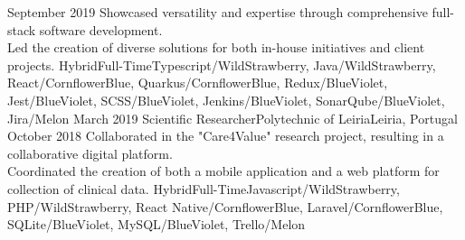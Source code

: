 \begin{experiences}
  {September 2019}    {Showcased versatility and expertise through comprehensive full-stack software development.\\
  Led the creation of diverse solutions for both in-house initiatives and client projects.}
  {Hybrid}{Full-Time}{Typescript/WildStrawberry, Java/WildStrawberry, React/CornflowerBlue, Quarkus/CornflowerBlue, Redux/BlueViolet, Jest/BlueViolet, SCSS/BlueViolet, Jenkins/BlueViolet, SonarQube/BlueViolet, Jira/Melon}
  \emptySeparator
  \experience
  {March 2019}     {Scientific Researcher}{Polytechnic of Leiria}{Leiria, Portugal}
  {October 2018}    {Collaborated in the "Care4Value" research project, resulting in a collaborative digital platform.\\
  Coordinated the creation of both a mobile application and a web platform for collection of clinical data.}
  {Hybrid}{Full-Time}{Javascript/WildStrawberry, PHP/WildStrawberry, React Native/CornflowerBlue, Laravel/CornflowerBlue, SQLite/BlueViolet, MySQL/BlueViolet, Trello/Melon}
\end{experiences}